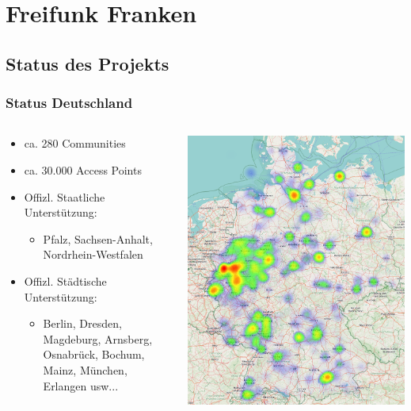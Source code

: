 \section{Freifunk Franken}
\subsection{Status des Projekts}

\begin{frame}
\frametitle{Status Deutschland}
	\begin{columns}[c]   
		\begin{column}[T]{0.6\textwidth}     
			\begin{itemize}
				\item ca. 280 Communities \footnotemark[1]
				\item ca. 30.000 Access Points \footnotemark[1]
				\item Offizl. Staatliche Unterstützung:
				\begin{itemize}
					\item Pfalz, Sachsen-Anhalt, Nordrhein-Westfalen 
				\end{itemize}
				\item Offizl. Städtische Unterstützung:
				\begin{itemize}
					\item Berlin, Dresden, Magdeburg, Arnsberg, Osnabrück, Bochum, Mainz, München, Erlangen usw...
				\end{itemize}
			\end{itemize}
		\end{column}
		\begin{column}[T]{0.4\textwidth}     
			\includegraphics[width=\textwidth]{images/heatmap_germany.png} 

\end{column}
\end{columns}
\end{frame}
